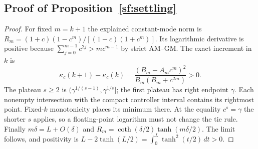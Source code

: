 \documentclass[journal]{IEEEtran}
\begin{document}
\subsection{Proof of Proposition~\ref{sf:settling}}
\begin{proof}\leavevmode
For fixed $m=k+1$ the explained constant-mode norm is
$R_m=(1+c)(1-c^m)/[(1-c)(1+c^m)]$.
Its logarithmic derivative is positive because
$\sum_{j=0}^{m-1}c^{2j}>mc^{m-1}$ by strict AM--GM.
The exact increment in $k$ is
\[
\kappa_c(k+1)-\kappa_c(k)
=\frac{(B_m-A_mc^m)^2}{B_m(B_m+c^{2m})}>0.
\]
The plateau $s\ge2$ is $(\gamma^{1/(s-1)},\gamma^{1/s}]$;
the first plateau has right endpoint $\gamma$.
Each nonempty intersection with the compact controller interval contains its
rightmost point. Fixed-$k$ monotonicity places its minimum there.
At the equality $c^s=\gamma$ the shorter $s$ applies, so a floating-point
logarithm must not change the tie rule.
Finally $m\delta=L+O(\delta)$ and
$R_m=\coth(\delta/2)\tanh(m\delta/2)$.
The limit follows, and positivity is
$L-2\tanh(L/2)=\int_0^L\tanh^2(t/2)\,dt>0$.
\end{proof}
\end{document}
